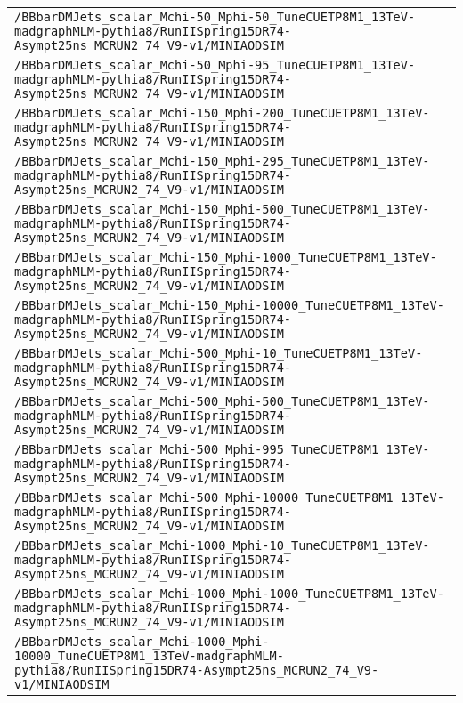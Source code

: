 \begin{center}
\begin{tabular}{l}
\verb!/BBbarDMJets_scalar_Mchi-50_Mphi-50_TuneCUETP8M1_13TeV-madgraphMLM-pythia8/RunIISpring15DR74-Asympt25ns_MCRUN2_74_V9-v1/MINIAODSIM! \tabularnewline
\verb!/BBbarDMJets_scalar_Mchi-50_Mphi-95_TuneCUETP8M1_13TeV-madgraphMLM-pythia8/RunIISpring15DR74-Asympt25ns_MCRUN2_74_V9-v1/MINIAODSIM! \tabularnewline
\verb!/BBbarDMJets_scalar_Mchi-150_Mphi-200_TuneCUETP8M1_13TeV-madgraphMLM-pythia8/RunIISpring15DR74-Asympt25ns_MCRUN2_74_V9-v1/MINIAODSIM! \tabularnewline
\verb!/BBbarDMJets_scalar_Mchi-150_Mphi-295_TuneCUETP8M1_13TeV-madgraphMLM-pythia8/RunIISpring15DR74-Asympt25ns_MCRUN2_74_V9-v1/MINIAODSIM! \tabularnewline
\verb!/BBbarDMJets_scalar_Mchi-150_Mphi-500_TuneCUETP8M1_13TeV-madgraphMLM-pythia8/RunIISpring15DR74-Asympt25ns_MCRUN2_74_V9-v1/MINIAODSIM! \tabularnewline
\verb!/BBbarDMJets_scalar_Mchi-150_Mphi-1000_TuneCUETP8M1_13TeV-madgraphMLM-pythia8/RunIISpring15DR74-Asympt25ns_MCRUN2_74_V9-v1/MINIAODSIM! \tabularnewline
\verb!/BBbarDMJets_scalar_Mchi-150_Mphi-10000_TuneCUETP8M1_13TeV-madgraphMLM-pythia8/RunIISpring15DR74-Asympt25ns_MCRUN2_74_V9-v1/MINIAODSIM! \tabularnewline
\verb!/BBbarDMJets_scalar_Mchi-500_Mphi-10_TuneCUETP8M1_13TeV-madgraphMLM-pythia8/RunIISpring15DR74-Asympt25ns_MCRUN2_74_V9-v1/MINIAODSIM! \tabularnewline
\verb!/BBbarDMJets_scalar_Mchi-500_Mphi-500_TuneCUETP8M1_13TeV-madgraphMLM-pythia8/RunIISpring15DR74-Asympt25ns_MCRUN2_74_V9-v1/MINIAODSIM! \tabularnewline
\verb!/BBbarDMJets_scalar_Mchi-500_Mphi-995_TuneCUETP8M1_13TeV-madgraphMLM-pythia8/RunIISpring15DR74-Asympt25ns_MCRUN2_74_V9-v1/MINIAODSIM! \tabularnewline
\verb!/BBbarDMJets_scalar_Mchi-500_Mphi-10000_TuneCUETP8M1_13TeV-madgraphMLM-pythia8/RunIISpring15DR74-Asympt25ns_MCRUN2_74_V9-v1/MINIAODSIM! \tabularnewline
\verb!/BBbarDMJets_scalar_Mchi-1000_Mphi-10_TuneCUETP8M1_13TeV-madgraphMLM-pythia8/RunIISpring15DR74-Asympt25ns_MCRUN2_74_V9-v1/MINIAODSIM! \tabularnewline
\verb!/BBbarDMJets_scalar_Mchi-1000_Mphi-1000_TuneCUETP8M1_13TeV-madgraphMLM-pythia8/RunIISpring15DR74-Asympt25ns_MCRUN2_74_V9-v1/MINIAODSIM! \tabularnewline
\verb!/BBbarDMJets_scalar_Mchi-1000_Mphi-10000_TuneCUETP8M1_13TeV-madgraphMLM-pythia8/RunIISpring15DR74-Asympt25ns_MCRUN2_74_V9-v1/MINIAODSIM! \tabularnewline
\hline
\end{tabular}\end{center}
